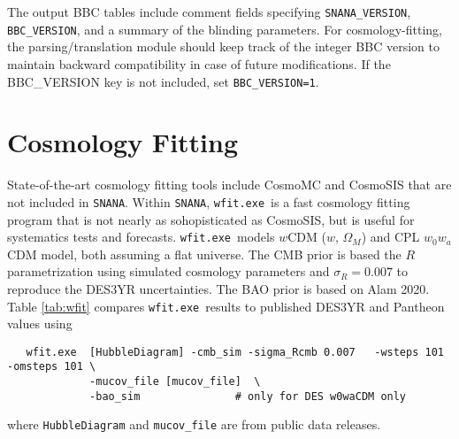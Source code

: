 \documentclass[12pt]{article}
\newcommand{\snana}{{\tt SNANA}}
\newcommand{\OM}{\Omega_M}
\begin{document}
The output BBC tables include comment fields specifying
{\tt SNANA\_VERSION},  {\tt BBC\_VERSION},
and a summary of the blinding parameters. 
For cosmology-fitting, the parsing/translation module
should keep track of the integer BBC version to maintain 
backward compatibility in case of future modifications.
If the {BBC\_VERSION} key is not included, set {\tt BBC\_VERSION=1}.

   \clearpage
   \section{Cosmology Fitting}
   \label{sec:wfit}

\newcommand{\wfit}{{\tt wfit.exe}}
\newcommand{\de}{{$w_0w_a$CDM}}

State-of-the-art cosmology fitting tools include CosmoMC and CosmoSIS
that are not included in \snana. 
Within \snana, \wfit\ is a fast cosmology fitting program that
is not nearly as sohopisticated as CosmoSIS, but is useful for 
systematics tests and forecasts. 
\wfit\ models $w$CDM ($w$, $\OM$) and CPL $w_0w_a$CDM model,
both assuming a flat universe. 
The CMB prior is based the $R$ parametrization using simulated cosmology parameters
and $\sigma_R=0.007$ to reproduce the DES3YR uncertainties. 
The BAO prior is based on Alam 2020.
Table \ref{tab:wfit} compares \wfit\ results to published DES3YR and Pantheon values using
%
\begin{verbatim}
   wfit.exe  [HubbleDiagram] -cmb_sim -sigma_Rcmb 0.007   -wsteps 101 -omsteps 101 \
             -mucov_file [mucov_file]  \
             -bao_sim               # only for DES w0waCDM only
\end{verbatim}
where {\tt HubbleDiagram} and {\tt mucov\_file} are from public data releases.
\end{document}
